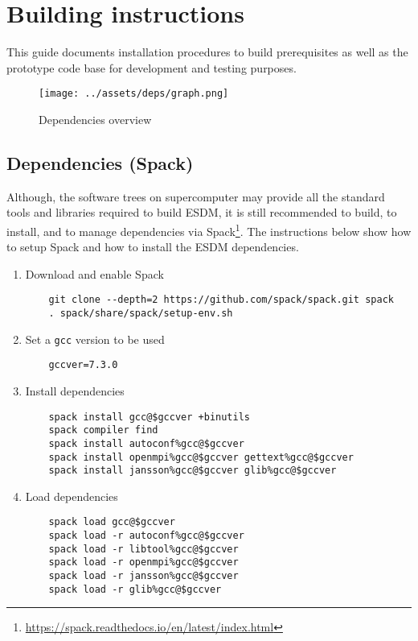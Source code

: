 \section{Building instructions}%
\label{installation-instructions-for-mistral}
This guide documents installation procedures to build prerequisites as well as the prototype code base for development and testing purposes.

\begin{figure}[!ht]
  \begin{center}
    \texttt{[image: ../assets/deps/graph.png]}
  \end{center}
  \caption{Dependencies overview}
  \label{fig:deps}
\end{figure}

\subsection{Dependencies (Spack)}%
\label{satisfying-requirements}
Although, the software trees on supercomputer may provide all the standard tools and libraries required to build ESDM, it is still recommended to build, to install, and to manage dependencies via Spack\footnote{\url{https://spack.readthedocs.io/en/latest/index.html}}.
The instructions below show how to setup Spack and how to install the ESDM dependencies.

\begin{enumerate}
  \item Download and enable Spack
    \begin{lstlisting}
    git clone --depth=2 https://github.com/spack/spack.git spack
    . spack/share/spack/setup-env.sh
    \end{lstlisting}
  \item Set a \lstinline|gcc| version to be used
    \begin{lstlisting}
    gccver=7.3.0
    \end{lstlisting}
  \item Install dependencies
    \begin{lstlisting}
    spack install gcc@$gccver +binutils
    spack compiler find
    spack install autoconf%gcc@$gccver
    spack install openmpi%gcc@$gccver gettext%gcc@$gccver
    spack install jansson%gcc@$gccver glib%gcc@$gccver
    \end{lstlisting}
  \item Load dependencies
    \begin{lstlisting}
    spack load gcc@$gccver
    spack load -r autoconf%gcc@$gccver
    spack load -r libtool%gcc@$gccver
    spack load -r openmpi%gcc@$gccver
    spack load -r jansson%gcc@$gccver
    spack load -r glib%gcc@$gccver
    \end{lstlisting}
\end{enumerate}



